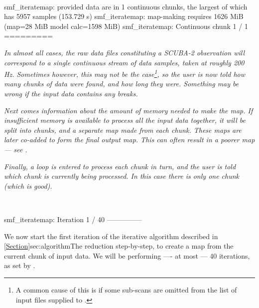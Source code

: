 ~
\begin{terminalv}
smf_iteratemap: provided data are in 1 continuous chunks, the largest of which
has 5957 samples (153.729 s)
smf_iteratemap: map-making requires 1626 MiB (map=28 MiB model calc=1598 MiB)
smf_iteratemap: Continuous chunk 1 / 1 =========
\end{terminalv}

\emph{In almost all cases, the raw data files constituting a SCUBA-2
observation will correspond to a single continuous stream of data
samples, taken at roughly 200 Hz. Sometimes however, this may not be the
case\footnote{A common cause of this is if some sub-scans are omitted
from the list of input files supplied to .}, so the user is
now told how many chunks of data were found, and how long they were.
Something may be wrong if the input data contains any breaks.}

\emph{Next comes information about the amount of memory needed to make
the map. If insufficient memory is available to process all the input
data together, it will be split into chunks, and a separate map made from
each chunk. These maps are later co-added to form the final output map.
This can often result in a poorer map --- see 
{}.}

\emph{Finally, a loop is entered to process each chunk in turn, and the
user is told which chunk is currently being processed. In this
case there  is only one chunk (which is good).}

~
\begin{terminalv}
smf_iteratemap: Iteration 1 / 40 ---------------
\end{terminalv}

We now start the first iteration of the iterative algorithm described in
\cref{Section}{sec:algorithm}{The reduction step-by-step}, to create a
map from the current chunk of  input data. We will be performing ----
at most --- 40 iterations, as set by .

